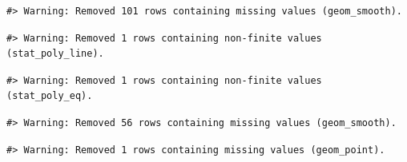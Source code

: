 \documentclass[
  letterpaper,
  DIV=11,
  numbers=noendperiod]{scrreprt}
\newenvironment{Shaded}{\begin{snugshade}}{\end{snugshade}}
\newcommand{\AttributeTok}[1]{\textcolor[rgb]{0.40,0.45,0.13}{#1}}
\newcommand{\CommentTok}[1]{\textcolor[rgb]{0.37,0.37,0.37}{#1}}
\newcommand{\DecValTok}[1]{\textcolor[rgb]{0.68,0.00,0.00}{#1}}
\newcommand{\FunctionTok}[1]{\textcolor[rgb]{0.28,0.35,0.67}{#1}}
\newcommand{\NormalTok}[1]{\textcolor[rgb]{0.00,0.23,0.31}{#1}}
\newcommand{\OtherTok}[1]{\textcolor[rgb]{0.00,0.23,0.31}{#1}}
\newcommand{\SpecialCharTok}[1]{\textcolor[rgb]{0.37,0.37,0.37}{#1}}
\begin{document}
\begin{Shaded}
\end{Shaded}

\begin{verbatim}
#> Warning: Removed 101 rows containing missing values (geom_smooth).
\end{verbatim}

\begin{verbatim}
#> Warning: Removed 1 rows containing non-finite values (stat_poly_line).
\end{verbatim}

\begin{verbatim}
#> Warning: Removed 1 rows containing non-finite values (stat_poly_eq).
\end{verbatim}

\begin{verbatim}
#> Warning: Removed 56 rows containing missing values (geom_smooth).
\end{verbatim}

\begin{verbatim}
#> Warning: Removed 1 rows containing missing values (geom_point).
\end{verbatim}
\end{document}
